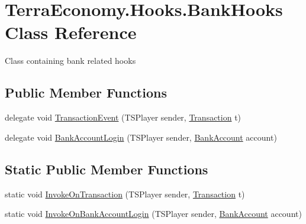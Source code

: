 \hypertarget{class_terra_economy_1_1_hooks_1_1_bank_hooks}{}\section{Terra\+Economy.\+Hooks.\+Bank\+Hooks Class Reference}
\label{class_terra_economy_1_1_hooks_1_1_bank_hooks}


Class containing bank related hooks  


\subsection*{Public Member Functions}
\begin{DoxyCompactItemize}
\item 
delegate void \hyperlink{class_terra_economy_1_1_hooks_1_1_bank_hooks_a2474c117fc1cf81a1582effae690e157}{Transaction\+Event} (T\+S\+Player sender, \hyperlink{class_terra_economy_1_1_util_1_1_transaction}{Transaction} t)
\item 
delegate void \hyperlink{class_terra_economy_1_1_hooks_1_1_bank_hooks_a4686a5b7f10a6bf6f9e18e9493c7626f}{Bank\+Account\+Login} (T\+S\+Player sender, \hyperlink{class_terra_economy_1_1_util_1_1_bank_account}{Bank\+Account} account)
\end{DoxyCompactItemize}
\subsection*{Static Public Member Functions}
\begin{DoxyCompactItemize}
\item 
static void \hyperlink{class_terra_economy_1_1_hooks_1_1_bank_hooks_a1e48e789b22686f8e63d82211d6a69f3}{Invoke\+On\+Transaction} (T\+S\+Player sender, \hyperlink{class_terra_economy_1_1_util_1_1_transaction}{Transaction} t)
\item 
static void \hyperlink{class_terra_economy_1_1_hooks_1_1_bank_hooks_ae73d60a6b5d0bae6238fcaf1bfaa7697}{Invoke\+On\+Bank\+Account\+Login} (T\+S\+Player sender, \hyperlink{class_terra_economy_1_1_util_1_1_bank_account}{Bank\+Account} account)
\end{DoxyCompactItemize}
